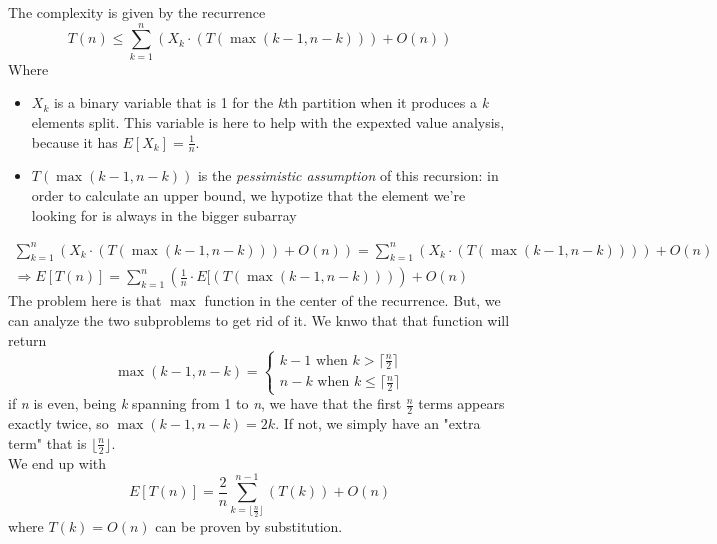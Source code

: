 \documentclass{article}
\begin{document}
				The complexity is given by the recurrence
				\begin{equation}
					T(n) \leq \sum_{k = 1}^n (X_k \cdot (T(\max(k - 1, n - k))) + O(n))
				\end{equation}
				Where
				\begin{itemize}
					\item $X_k$ is a binary variable that is 1 for the \emph{k}th partition when it produces a \emph{k} elements split. This variable is here to help with the expexted value analysis, because it has $E[X_k] = \frac{1}{n}$.
					\item $T(\max(k - 1, n - k))$ is the \textit{pessimistic assumption} of this recursion: in order to calculate an upper bound, we hypotize that the element we're looking for is always in the bigger subarray
				\end{itemize}
				\begin{align*}
					\sum_{k = 1}^n (X_k \cdot (T(\max(k - 1, n - k))) + O(n)) = \sum_{k = 1}^n (X_k \cdot (T(\max(k - 1, n - k)))) + O(n) \\
					\Rightarrow E[T(n)] = \sum_{k = 1}^n (\frac{1}{n} \cdot E[(T(\max(k - 1, n - k)))) + O(n) 
				\end{align*}
				The problem here is that $\max$ function in the center of the recurrence. But, we can analyze the two subproblems to get rid of it. We knwo that that function will return
				\begin{equation}
					\max(k - 1, n - k) =
					\begin{cases}
						k - 1 \text{ when } k > \lceil \frac{n}{2} \rceil \\
						n - k \text{ when } k \leq \lceil \frac{n}{2} \rceil
					\end{cases}
				\end{equation}
				if \emph{n} is even, being \emph{k} spanning from 1 to \emph{n}, we have that the first $\frac{n}{2}$ terms appears exactly twice, so $\max(k - 1, n - k) = 2k$. If not, we simply have an "extra term" that is $\lfloor \frac{n}{2} \rfloor$.\\
				We end up with
				\begin{equation}
					E[T(n)] = \frac{2}{n} \sum_{k = \lfloor \frac{n}{2} \rfloor}^{n-1}(T(k)) + O(n)
				\end{equation}
				where $T(k) = O(n)$ can be proven by substitution.
\end{document}
